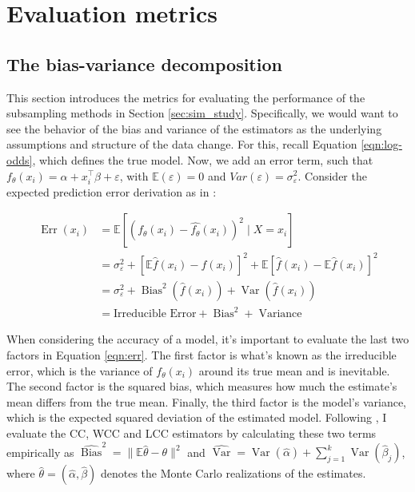 \section{Evaluation metrics}
\label{sec:metrics}

\subsection{The bias-variance decomposition}

This section introduces the metrics for evaluating the performance of the subsampling methods in Section \ref{sec:sim_study}. Specifically, we would want to see the behavior of the bias and variance of the estimators as the underlying assumptions and structure of the data change. For this, recall Equation \ref{eqn:log-odds}, which defines the true model. Now, we add an error term, such that  $f_\theta (x_i) = \alpha + x_i^\intercal \beta + \varepsilon$, with $\mathbb{E}(\varepsilon) = 0$ and $Var(\varepsilon) = \sigma_{\varepsilon}^2$. Consider the expected prediction error derivation as in \textcite{hastie2009elements}:

\begin{equation}
    \begin{aligned}
    \operatorname{Err}\left(x_i\right) & =\mathbb{E}\left[\left(f_\theta (x_i)-\hat{f_\theta}\left(x_i\right)\right)^2 \mid X = x_i \right] \\
    & =\sigma_{\varepsilon}^2+\left[\mathbb{E} \hat{f}\left(x_i\right)-f\left(x_i\right)\right]^2+\mathbb{E}\left[\hat{f}\left(x_i\right)-\mathbb{E} \hat{f}\left(x_i\right)\right]^2 \\
    & =\sigma_{\varepsilon}^2+\operatorname{Bias}^2\left(\hat{f}\left(x_i\right)\right)+\operatorname{Var}\left(\hat{f}\left(x_i\right)\right) \\
    & =\text{Irreducible Error}+\operatorname{Bias}^2+\operatorname{Variance}
    \label{eqn:err}
    \end{aligned}
\end{equation}


When considering the accuracy of a model, it's important to evaluate the last two factors in Equation \ref{eqn:err}. The first factor is what's known as the irreducible error, which is the variance of $f_\theta (x_i)$ around its true mean and is inevitable. The second factor is the squared bias, which measures how much the estimate's mean differs from the true mean. Finally, the third factor is the model's variance, which is the expected squared deviation of the estimated model. Following \textcite{hastie2014}, I evaluate the CC, WCC and LCC estimators by calculating these two terms empirically as $\widehat{\operatorname{Bias}}^2 = \|\mathbb{E}\hat{\theta} - \theta\|^2$ and $\widehat{\operatorname{Var}} = \operatorname{Var}(\hat{\alpha}) + \sum_{j=1}^k \operatorname{Var}(\hat{\beta}_j)$, where $\hat{\theta} = (\hat{\alpha}, \hat{\beta})$ denotes the Monte Carlo realizations of the estimates.


